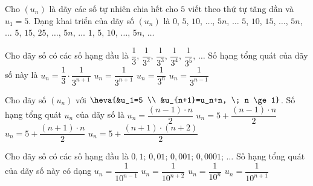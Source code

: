 \begin{ex}%
	Cho $(u_n)$ là dãy các  số tự nhiên chia hết cho $5$ viết theo thứ tự tăng dần và $u_1=5$. Dạng khai triển của dãy số $(u_n)$ là
	\choice 
		 {$0$, $5$, $10$, $\ldots$, $5n$, $\ldots$}
		{\True $5$, $10$, $15$, $\ldots$, $5n$, $\ldots$} 
		 {$5$, $15$, $25$, $\ldots$, $5n$, $\ldots$}
		{$1$, $5$,  $10$, $\ldots$, $5n$, $\ldots$}
\end{ex}

\begin{ex}%
	Cho dãy số có các số hạng đầu là $\dfrac{1}{3}$, $\dfrac{1}{3^2}$, $\dfrac{1}{3^3}$, $\dfrac{1}{3^4}$, $\dfrac{1}{3^5}$, $\ldots$ Số hạng tổng quát của dãy  số này là
	\choice 
		{$u_n  = \dfrac{1}{3} \cdot \dfrac{1}{3^{n+1}}$}
		{$u_n =  \dfrac{1}{3^{n+1}}$}
		 {\True $u_n = \dfrac{1}{3^n}$}
		{$u_n = \dfrac{1}{3^{n-1}}$} 
\end{ex}

\begin{ex}%
	Cho dãy số $(u_n)$ với $\heva{&u_1=5 \\ &u_{n+1}=u_n+n, \; n \ge 1}$. Số hạng tổng quát $u_n$ của  dãy số là
	\choice 
		{$u_n=\dfrac{(n-1)  \cdot n}{2}$}
		 {\True $u_n=5+\dfrac{(n-1) \cdot n}{2}$}
		{$u_n=5+\dfrac{(n+1)  \cdot n}{2}$}
		 {$u_n=5+\dfrac{(n+1) \cdot (n+2)}{2}$}
\end{ex}

\begin{ex}%
	Cho dãy số có các số hạng đầu  là $0{,}1$; $0{,}01$; $0{,}001$; $0{,}0001$; $\ldots$ Số hạng tổng quát của dãy số này có dạng
	 \choice
		 {$u_n = \dfrac{1}{10^{n-1}}$}
		{$u_n = \dfrac{1}{10^{n+2}}$} 
		 {\True $u_n = \dfrac{1}{10^n}$}
		{$u_n  = \dfrac{1}{10^{n+1}}$}
\end{ex}

